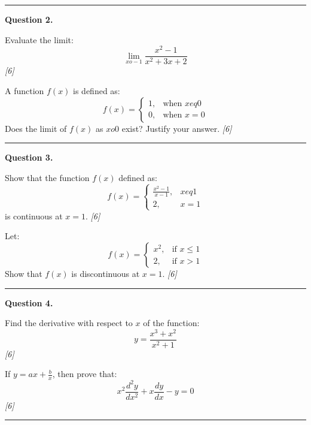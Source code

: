 \documentclass[11pt,a4paper]{article}
\newcommand{\pts}[1]{\hfill   \textit{[#1]}}
\begin{document}
\medskip\rule{\linewidth}{0.2pt}

\medskip


\noindent   \textbf{Question 2.}

\begin{parts}
  \item Evaluate the limit:
  \[ \lim_{x o -1} \frac{x^2 - 1}{x^2 + 3x + 2} \] \pts{6}
  \item A function $f(x)$ is defined as:
  \[ f(x) = 
\begin{cases} 1, &  \text{when } x 
eq 0 \\ 0, &  \text{when } x = 0 \end{cases} \]
  Does the limit of $f(x)$ as $x  o 0$ exist? Justify your answer. \pts{6}
\end{parts}

\medskip\rule{\linewidth}{0.2pt}

\medskip


\noindent   \textbf{Question 3.}

\begin{parts}
  \item Show that the function $f(x)$ defined as:
  \[ f(x) = 
\begin{cases} \frac{x^2 - 1}{x - 1}, & x 
eq 1 \\ 2, & x = 1 \end{cases} \]
  is continuous at $x = 1$. \pts{6}
  \item Let:
  \[ f(x) = 
\begin{cases} x^2, &  \text{if } x \le 1 \\ 2, &  \text{if } x > 1 \end{cases} \]
  Show that $f(x)$ is discontinuous at $x = 1$. \pts{6}
\end{parts}

\medskip\rule{\linewidth}{0.2pt}

\medskip


\noindent   \textbf{Question 4.}

\begin{parts}
  \item Find the derivative with respect to $x$ of the function:
  \[ y = \frac{x^3 + x^2}{x^2 + 1} \] \pts{6}
  \item If $y = ax + \frac{b}{x}$, then prove that:
  \[ x^2 \frac{d^2y}{dx^2} + x \frac{dy}{dx} - y = 0 \] \pts{6}
\end{parts}

\medskip\rule{\linewidth}{0.2pt}

\medskip
\end{document}
